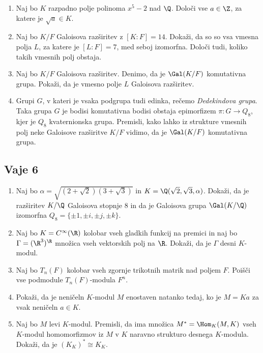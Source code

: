 \begin{enumerate}
    \item Naj bo $K$ razpadno polje polinoma $x^5 - 2$ nad $\Q$. Določi vse $a \in \Z$, za katere je $\sqrt{a} \in K$.
    \item Naj bo $K/F$ Galoisova razširitev z $[K:F] = 14$. Dokaži, da so so vsa vmesna polja $L$, za katere je 
    $[L:F] = 7$, med seboj izomorfna. Določi tudi, koliko takih vmesnih polj obstaja.
    \item Naj bo $K/F$ Galoisova razširitev. Denimo, da je $\Gal(K/F)$ komutativna grupa. Pokaži, da je 
    vmesno polje $L$ Galoisova razširitev.
    \item Grupi $G$, v kateri je vsaka podgrupa tudi edinka, rečemo \emph{Dedekindova grupa}.
    Taka grupa $G$ je bodisi komutativna bodisi obstaja epimorfizem $\pi \colon G \to Q_8$, kjer je $Q_8$ 
    kvaternionska grupa. Premisli, kako lahko iz strukture vmesnih polj neke Galoisove razširitve $K/F$ vidimo, 
    da je $\Gal(K/F)$ komutativna grupa.
\end{enumerate}

\subsection*{Vaje 6}

\begin{enumerate}
    \item Naj bo $\alpha = \sqrt{(2 + \sqrt{2})(3 + \sqrt{3})}$ in $K = \Q(\sqrt{2}, \sqrt{3}, \alpha)$. 
    Dokaži, da je razširitev $K/\Q$ Galoisova stopnje $8$ in da je Galoisova grupa $\Gal(K/\Q)$ 
    izomorfna $Q_8 = \{ \pm 1, \pm i, \pm j, \pm k \}$.
    \item Naj bo $K = C^{\infty}(\R)$ kolobar vseh gladkih funkcij na premici in naj bo 
    $\Gamma = (\R^3)^{\R}$ množica vseh vektorskih polj na $\R$. 
    Dokaži, da je $\Gamma$ desni $K$-modul.
    \item Naj bo $T_n(F)$ kolobar vseh zgornje trikotnih matrik nad poljem $F$. 
    Poišči vse podmodule $T_n(F)$-modula $F^n$.
    \item Pokaži, da je neničeln $K$-modul $M$ enostaven natanko tedaj, ko je $M = K a$ za vsak neničeln $a \in K$.
    \item Naj bo $M$ levi $K$-modul. Premisli, da ima množica $M^* = \Hom_K(M, K)$ 
    vseh $K$-modul homomorfizmov iz $M$ v $K$ naravno strukturo desnega $K$-modula. 
    Dokaži, da je $(K_K)^* \cong K_K$.
\end{enumerate}

%

%
